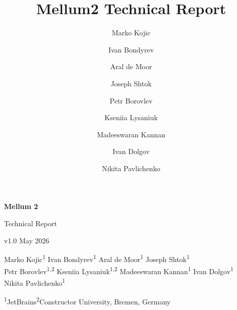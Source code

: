 \documentclass{llmxive}
\title{Mellum2 Technical Report}
\author{Marko Kojic \and Ivan Bondyrev \and Aral de Moor \and Joseph Shtok \and Petr Borovlev \and Kseniia Lysaniuk \and Madeeswaran Kannan \and Ivan Dolgov \and Nikita Pavlichenko}
\providecommand{\reportdate}{May 2026}
\providecommand{\reportversion}{v1.0}
\begin{document}
\maketitle
\vspace*{-2.0cm}

\noindent\par
\vspace{0.15cm}

\noindent\makebox[0pt][l]{\hspace*{-2.4cm}\rule{\paperwidth}{3.5pt}}\par

\vspace{0.7cm}

\begin{center}

{
  \jbsans
  \fontsize{36}{42}\selectfont
  \textbf{Mellum 2}
}

\vspace{0.25cm}

{
  \jbsans
  \fontsize{14}{18}\selectfont
  Technical Report
}

\vspace{0.20cm}

{
  \small\textsf{\reportversion\,\textperiodcentered\,\reportdate}
}

\vspace{1.0cm}

{
  \normalsize

  Marko Kojic\textsuperscript{1}\quad
  Ivan Bondyrev\textsuperscript{1}\quad
  Aral de Moor\textsuperscript{1}\quad
  Joseph Shtok\textsuperscript{1}\\[0.35em]
  Petr Borovlev\textsuperscript{1,2}\quad
  Kseniia Lysaniuk\textsuperscript{1,2}\quad
  Madeeswaran Kannan\textsuperscript{1}\quad
  Ivan Dolgov\textsuperscript{1}\\[0.35em]
  Nikita Pavlichenko\textsuperscript{1}

  \vspace{0.5cm}

  {\small\textsuperscript{1}JetBrains\quad\textsuperscript{2}Constructor University, Bremen, Germany}
}

\vspace{0.9cm}

\begin{minipage}{0.92\textwidth}
  


\end{minipage}
\end{center}
\end{document}
